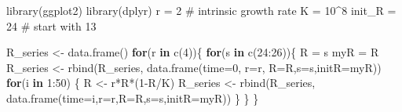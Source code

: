 \documentclass[
  a4paper,
]{scrbook}
\newenvironment{Shaded}{\begin{snugshade}}{\end{snugshade}}
\newcommand{\AttributeTok}[1]{\textcolor[rgb]{0.40,0.45,0.13}{#1}}
\newcommand{\CommentTok}[1]{\textcolor[rgb]{0.37,0.37,0.37}{#1}}
\newcommand{\ControlFlowTok}[1]{\textcolor[rgb]{0.00,0.23,0.31}{\textbf{#1}}}
\newcommand{\DecValTok}[1]{\textcolor[rgb]{0.68,0.00,0.00}{#1}}
\newcommand{\FunctionTok}[1]{\textcolor[rgb]{0.28,0.35,0.67}{#1}}
\newcommand{\NormalTok}[1]{\textcolor[rgb]{0.00,0.23,0.31}{#1}}
\newcommand{\OtherTok}[1]{\textcolor[rgb]{0.00,0.23,0.31}{#1}}
\newcommand{\SpecialCharTok}[1]{\textcolor[rgb]{0.37,0.37,0.37}{#1}}
\theoremstyle{definition}
\theoremstyle{remark}
\begin{document}
\begin{Shaded}
\begin{Highlighting}[]
\FunctionTok{library}\NormalTok{(ggplot2)}
\FunctionTok{library}\NormalTok{(dplyr)}
\NormalTok{r }\OtherTok{=} \DecValTok{2}        \CommentTok{\# intrinsic growth rate}
\NormalTok{K }\OtherTok{=} \DecValTok{10}\SpecialCharTok{\^{}}\DecValTok{8}
\NormalTok{init\_R }\OtherTok{=} \DecValTok{24}    \CommentTok{\# start with 13}

\NormalTok{R\_series }\OtherTok{\textless{}{-}} \FunctionTok{data.frame}\NormalTok{()}
\ControlFlowTok{for}\NormalTok{(r }\ControlFlowTok{in} \FunctionTok{c}\NormalTok{(}\DecValTok{4}\NormalTok{))\{}
  \ControlFlowTok{for}\NormalTok{(s }\ControlFlowTok{in} \FunctionTok{c}\NormalTok{(}\DecValTok{24}\SpecialCharTok{:}\DecValTok{26}\NormalTok{))\{ }
\NormalTok{    R }\OtherTok{=}\NormalTok{ s}
\NormalTok{    myR }\OtherTok{=}\NormalTok{ R}
\NormalTok{    R\_series }\OtherTok{\textless{}{-}} \FunctionTok{rbind}\NormalTok{(R\_series, }\FunctionTok{data.frame}\NormalTok{(}\AttributeTok{time=}\DecValTok{0}\NormalTok{, }\AttributeTok{r=}\NormalTok{r, }\AttributeTok{R=}\NormalTok{R,}\AttributeTok{s=}\NormalTok{s,}\AttributeTok{initR=}\NormalTok{myR))}
    \ControlFlowTok{for}\NormalTok{(i }\ControlFlowTok{in} \DecValTok{1}\SpecialCharTok{:}\DecValTok{50}\NormalTok{)}
\NormalTok{    \{}
\NormalTok{      R }\OtherTok{\textless{}{-}}\NormalTok{ r}\SpecialCharTok{*}\NormalTok{R}\SpecialCharTok{*}\NormalTok{(}\DecValTok{1}\SpecialCharTok{{-}}\NormalTok{R}\SpecialCharTok{/}\NormalTok{K)}
\NormalTok{      R\_series }\OtherTok{\textless{}{-}} \FunctionTok{rbind}\NormalTok{(R\_series, }\FunctionTok{data.frame}\NormalTok{(}\AttributeTok{time=}\NormalTok{i,}\AttributeTok{r=}\NormalTok{r,}\AttributeTok{R=}\NormalTok{R,}\AttributeTok{s=}\NormalTok{s,}\AttributeTok{initR=}\NormalTok{myR))}
\NormalTok{    \}}
\NormalTok{  \}}
\NormalTok{\}}


\end{Highlighting}
\end{Shaded}
\end{document}
